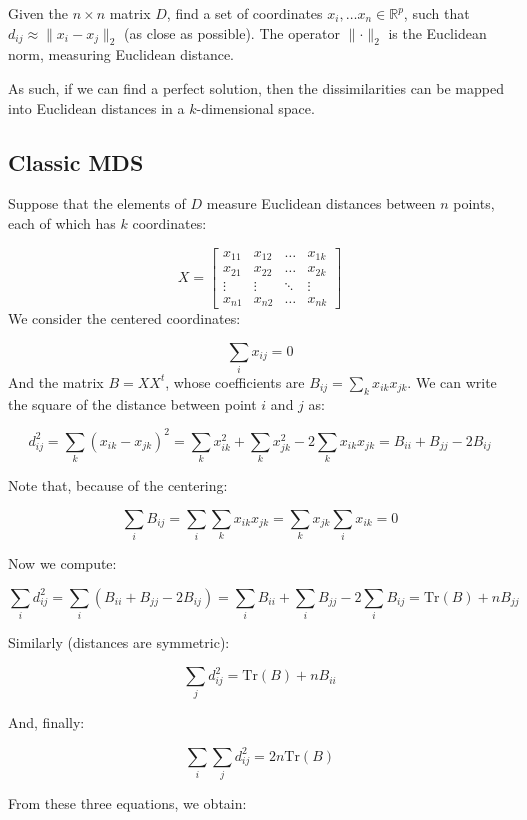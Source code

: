 \documentclass[
  letterpaper,
  DIV=11,
  numbers=noendperiod]{scrreprt}
\begin{document}
Given the \(n \times n\) matrix \(D\), find a set of coordinates
\(x_i, \ldots x_n \in \mathbb R^p\), such that
\(d_{ij} \approx \lVert x_i - x_j \rVert_2\) (as close as possible). The
operator \(\lVert \cdot \rVert_2\) is the Euclidean norm, measuring
Euclidean distance.

As such, if we can find a perfect solution, then the dissimilarities can
be mapped into Euclidean distances in a \(k\)-dimensional space.

\hypertarget{classic-mds}{%
\subsection{Classic MDS}\label{classic-mds}}

Suppose that the elements of \(D\) measure Euclidean distances between
\(n\) points, each of which has \(k\) coordinates:

\[
X = \begin{bmatrix}
    x_{11} & x_{12} &  \dots  & x_{1k} \\
    x_{21} & x_{22} &  \dots  & x_{2k} \\
    \vdots & \vdots &  \ddots & \vdots \\
    x_{n1} & x_{n2} &  \dots  & x_{nk}
\end{bmatrix}
\] We consider the centered coordinates:

\[
\sum_i x_{ij} = 0
\] And the matrix \(B = X X^t\), whose coefficients are
\(B_{ij} = \sum_k x_{ik} x_{jk}\). We can write the square of the
distance between point \(i\) and \(j\) as:

\[ d_{ij}^2 = \sum_k (x_{ik} - x_{jk})^2  = \sum_k x_{ik}^2 + \sum_k x_{jk}^2 -2 \sum_k x_{ik} x_{jk} = B_{ii} + B_{jj} - 2 B_{ij}\]

Note that, because of the centering:

\[
\sum_i B_{ij} = \sum_i \sum_k x_{ik} x_{jk} = \sum_k x_{jk} \sum_i x_{ik} = 0
\]

Now we compute:

\[
\sum_i d_{ij}^2 = \sum_i (B_{ii} + B_{jj} - 2 B_{ij}) = \sum_i B_{ii} + \sum_i B_{jj} - 2 \sum_i B_{ij} = \text{Tr}(B) + n B_{jj} 
\]

Similarly (distances are symmetric):

\[
\sum_j d_{ij}^2 = \text{Tr}(B) + n B_{ii} 
\]

And, finally:

\[
\sum_i \sum_j d_{ij}^2 = 2 n \text{Tr}(B)
\]

From these three equations, we obtain:
\end{document}
